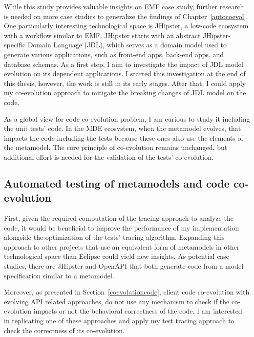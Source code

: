 While this study provides valuable insights on EMF case study, further research is needed on more case studies to generalize the findings of Chapter~\ref{autocoevol}. One particularly interesting technological space is JHipster, a low-code ecosystem with a workflow similar to EMF. JHipster starts with an abstract JHipster-specific Domain Language (JDL), which serves as a domain model used to generate various applications, such as front-end apps, back-end apps, and database schemas. As a first step, I aim to investigate the impact of JDL model evolution on its dependent applications. I started this investigation at the end of this thesis, however, the work is still in its early stages. After that, I could apply my co-evolution approach to mitigate the breaking changes of JDL model on the code.

As a global view for code co-evolution problem, I am curious to study it including the unit tests' code. In the MDE ecosystem, when the metamodel evolves, that impacts the code including the tests because these ones also use the elements of the metamodel. The core principle of co-evolution remains unchanged, but additional effort is needed for the validation of the tests' co-evolution.
%


%
%


\subsection{Automated testing of metamodels and code co-evolution}
First, given the required computation of the tracing approach to analyze the code, it would be beneficial to improve the performance of my implementation alongside the optimization of the tests' tracing algorithm.  %
Expanding this approach to other projects that use an equivalent form of metamodels in other technological space than Eclipse could yield new insights. As potential case studies, there are JHipster and OpenAPI that both generate code from a model specification similar to a metamodel.%

Moreover, as presented in Section~\ref{coevolutioncode}, client code co-evolution with evolving API related approaches, do not use any mechanism to check if the co-evolution impacts or not the behavioral correctness of the code. I am interested in replicating one of these approaches and apply my test tracing approach to check the correctness of its co-evolution.

